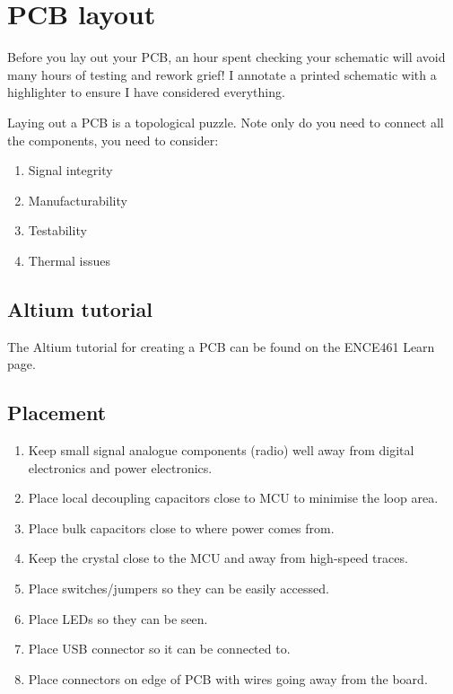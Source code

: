 \chapter{PCB layout}

Before you lay out your PCB, an hour spent checking your schematic
will avoid many hours of testing and rework grief!  I annotate a
printed schematic with a highlighter to ensure I have considered
everything.

Laying out a PCB is a topological puzzle.  Note only do you need to
connect all the components, you need to consider:
%
\begin{enumerate}
\item Signal integrity

\item Manufacturability

\item Testability

\item Thermal issues
\end{enumerate}



\section{Altium tutorial}

The Altium tutorial for creating a PCB can be found on the ENCE461
Learn page.


\label{pcb-recommendations}

\section{Placement}
\label{placement}

\begin{enumerate}
\item
  Keep small signal analogue components (radio) well away from digital
  electronics and power electronics.
\item
  Place local decoupling capacitors close to MCU to minimise the loop area.
\item
  Place bulk capacitors close to where power comes from.
\item
  Keep the crystal close to the MCU and away from high-speed traces.
\item
  Place switches/jumpers so they can be easily accessed.
\item
  Place LEDs so they can be seen.
\item
  Place USB connector so it can be connected to.
\item
  Place connectors on edge of PCB with wires going away from the board.
\end{enumerate}


